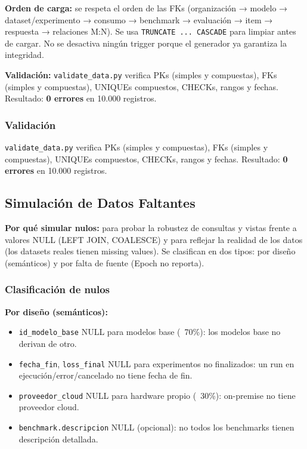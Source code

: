 \documentclass[12pt,a4paper]{article}
\begin{document}
\textbf{Orden de carga:} se respeta el orden de las FKs (organización → modelo → dataset/experimento → consumo → benchmark → evaluación → item → respuesta → relaciones M:N). Se usa \texttt{TRUNCATE ... CASCADE} para limpiar antes de cargar. No se desactiva ningún trigger porque el generador ya garantiza la integridad.

\textbf{Validación:} \texttt{validate\_data.py} verifica PKs (simples y compuestas), FKs (simples y compuestas), UNIQUEs compuestos, CHECKs, rangos y fechas. Resultado: \textbf{0 errores} en 10.000 registros.

\subsubsection{Validación}
\texttt{validate\_data.py} verifica PKs (simples y compuestas), FKs (simples y compuestas), UNIQUEs compuestos, CHECKs, rangos y fechas. Resultado: \textbf{0 errores} en 10.000 registros.

\subsection{Simulación de Datos Faltantes}

\textbf{Por qué simular nulos:} para probar la robustez de consultas y vistas frente a valores NULL (LEFT JOIN, COALESCE) y para reflejar la realidad de los datos (los datasets reales tienen missing values). Se clasifican en dos tipos: por diseño (semánticos) y por falta de fuente (Epoch no reporta).

\subsubsection{Clasificación de nulos}

\textbf{Por diseño (semánticos):}
\begin{itemize}
  \item \texttt{id\_modelo\_base} NULL para modelos base (~70\%): los modelos base no derivan de otro.
  \item \texttt{fecha\_fin}, \texttt{loss\_final} NULL para experimentos no finalizados: un run en ejecución/error/cancelado no tiene fecha de fin.
  \item \texttt{proveedor\_cloud} NULL para hardware propio (~30\%): on-premise no tiene proveedor cloud.
  \item \texttt{benchmark.descripcion} NULL (opcional): no todos los benchmarks tienen descripción detallada.
\end{itemize}
\end{document}
